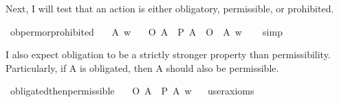 \begin{isabellebody}
\begin{isamarkuptext}
      Next, I will test that an action is either obligatory, permissible, or 
      prohibited.%
\end{isamarkuptext}\isamarkuptrue%
\isamarkupfalse%
\ ob{\isacharunderscore}perm{\isacharunderscore}or{\isacharunderscore}prohibited{\isacharcolon}\isanewline
\ \ \ A\ w\isanewline
\ \ \ {\isachardoublequoteopen}{\isacharparenleft}O\ {\isacharbraceleft}A{\isacharbraceright}\ \isactrlbold {\isasymor}\ {\isacharparenleft}P\ {\isacharbraceleft}A{\isacharbraceright}\ \isactrlbold {\isasymor}\ O\ {\isacharbraceleft}\isactrlbold {\isasymnot}\ A{\isacharbraceright}{\isacharparenright}{\isacharparenright}\ w{\isachardoublequoteclose}\isanewline
%
\isadelimproof
\ \ %
\endisadelimproof
%
\isatagproof
{}\isamarkupfalse%
\ simp\isanewline
%
%
\endisatagproof
{\isafoldproof}%
%
\isadelimproof
%
\endisadelimproof
%
\begin{isamarkuptext}%
I also expect obligation to be a strictly stronger property than permissibility. Particularly, 
if A is obligated, then A should also be permissible.%
\end{isamarkuptext}\isamarkuptrue%
\isamarkupfalse%
\ obligated{\isacharunderscore}then{\isacharunderscore}permissible{\isacharcolon}\isanewline
\ \ \ {\isachardoublequoteopen}{\isacharparenleft}O\ {\isacharbraceleft}A{\isacharbraceright}\ \isactrlbold {\isasymrightarrow}\ P\ {\isacharbraceleft}A{\isacharbraceright}{\isacharparenright}\ w{\isachardoublequoteclose}\isanewline
\ \ \isamarkupfalse%
{\isacharbrackleft}user{\isacharunderscore}axioms{\isacharbrackright}%
\isadelimproof
\ %
\endisadelimproof
%
\isatagproof
{}\isamarkupfalse%
\isanewline
%
\end{isabellebody}
